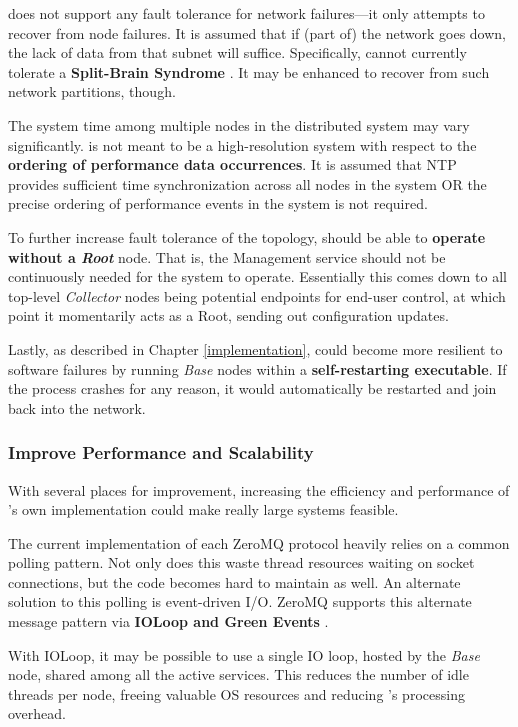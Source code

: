 \dcamp does not support any fault tolerance for network failures---it only attempts to recover from node failures. It is
assumed that if (part of) the network goes down, the lack of data from that subnet will suffice. Specifically, \dcamp
cannot currently tolerate a \textbf{Split-Brain Syndrome} \cite{needed}. It may be enhanced to recover from such network
partitions, though.

The system time among multiple nodes in the distributed system may vary significantly. \dcamp is not meant to be a
high-resolution system with respect to the \textbf{ordering of performance data occurrences}. It is assumed that NTP
provides sufficient time synchronization across all nodes in the system OR the precise ordering of performance events in
the system is not required.

To further increase fault tolerance of the topology, \dcamp should be able to \textbf{operate without a \textit{Root}}
node. That is, the Management service should not be continuously needed for the system to operate. Essentially this
comes down to all top-level \textit{Collector} nodes being potential endpoints for end-user control, at which point it
momentarily acts as a Root, sending out configuration updates.

Lastly, as described in Chapter \ref{implementation}, \dcamp could become more resilient to software failures by running
\textit{Base} nodes within a \textbf{self-restarting executable}. If the process crashes for any reason, it would
automatically be restarted and join back into the network.

\subsubsection{Improve Performance and Scalability}

With several places for improvement, increasing the efficiency and performance of \dcampns's own implementation could
make really large systems feasible.

The current implementation of each ZeroMQ protocol heavily relies on a common polling pattern. Not only does this waste
thread resources waiting on socket connections, but the code becomes hard to maintain as well. An alternate solution to
this polling is event-driven I/O. ZeroMQ supports this alternate message pattern via \textbf{IOLoop and Green Events}
\cite{needed}.

With IOLoop, it may be possible to use a single IO loop, hosted by the \textit{Base} node, shared among all the active
services. This reduces the number of idle threads per node, freeing valuable OS resources and reducing \dcampns's
processing overhead.

